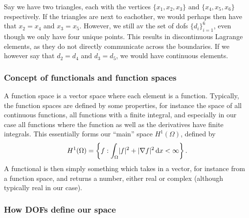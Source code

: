 Say we have two triangles, each with the vertices $\{x_1, x_2, x_3\}$ and $\{x_4, x_5, x_6\}$ respectively.
If the triangles are next to eachother, we would perhaps then have that $x_2 = x_4$ and $x_3 = x_5$.
However, we still av the set of dofs $\{d_i\}_{i = 1}^{6}$, even though we only have four unique points.
This results in discontinuous Lagrange elements, as they do not directly communicate across the boundaries.
If we however say that $d_2 = d_4$ and $d_3 = d_5$, we would have continuous elements.

\subsubsection{Concept of functionals and function spaces}
A function space is a vector space where each element is a function.
Typically, the function spaces are defined by some properties, for instance the space of all continuous functions, all functions with a finite integral, and especially in our case all functions where the function as well as the derivatives have finite integrals.
This essentially forms our ``main'' space $H^1(\Omega)$, defined by
\begin{equation}
    H^1(\Omega) =
    \left\{
        f
        :
        \int_{\Omega} \lvert f\rvert^2 + \lvert\nabla f\rvert^2 \mathop{}\!\mathrm{d} x < \infty
    \right\}.
\end{equation}
A functional is then simply something which takes in a vector, for instance from a function space, and returns a number, either real or complex (although typically real in our case).

\subsubsection{How DOFs define our space}
